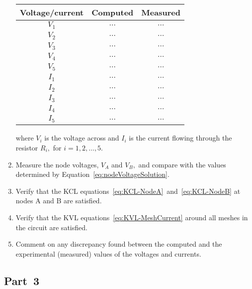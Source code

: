 \begin{enumerate}
  \begin{center}
  \begin{tabular}{c|c|c}
    \toprule
    Voltage/current & Computed & Measured\\
    \toprule
    $V_1$ & $\ldots$ & $\ldots$\\
    $V_2$ & $\ldots$ & $\ldots$\\
    $V_3$ & $\ldots$ & $\ldots$\\
    $V_4$ & $\ldots$ & $\ldots$\\
    $V_5$ & $\ldots$ & $\ldots$\\
    $I_1$ & $\ldots$ & $\ldots$\\
    $I_2$ & $\ldots$ & $\ldots$\\
    $I_3$ & $\ldots$ & $\ldots$\\
    $I_4$ & $\ldots$ & $\ldots$\\
    $I_5$ & $\ldots$ & $\ldots$\\    
    \bottomrule
  \end{tabular}     
  \end{center}
  
where $V_i$ is the voltage across and $I_i$ is the current flowing through  the resistor $R_i,$ for $i=1,2,\ldots, 5.$
  
\item Measure the node voltages, $V_A$ and $V_B,$ and compare with the values determined by Equation~\eqref{eq:nodeVoltageSolution}.
\item Verify that the KCL equations~\eqref{eq:KCL-NodeA}~and~\eqref{eq:KCL-NodeB} at nodes A and B are satisfied.

\item Verify that the KVL equations~\eqref{eq:KVL-MeshCurrent} around all meshes in the circuit are satisfied.
  
\item Comment on any discrepancy found between the computed and the experimental (measured) values of the voltages and currents. 
  
\end{enumerate}






\subsection{Part~3}
\label{sec:part3}


